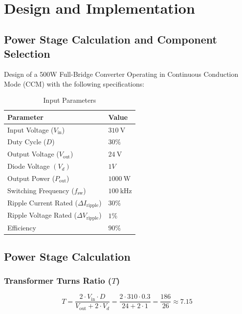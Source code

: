 \section{Design and Implementation}
\subsection{Power Stage Calculation and Component Selection}
Design of a 500W Full-Bridge Converter Operating in Continuous Conduction Mode (CCM) with
the following specifications:
\begin{table}[h!]
    \centering
    \begin{tabular}{ll}
        \toprule
        \textbf{Parameter} & \textbf{Value} \\
        \midrule
        Input Voltage ($V_{\text{in}}$) & $\SI{310}{\volt}$ \\
        Duty Cycle ($D$) & $30\% $ \\
        Output Voltage ($V_{\text{out}}$) & $\SI{24}{\volt}$ \\
        Diode Voltage $(V_d)$ & $1V$\\
        Output Power ($P_{\text{out}}$) & $\SI{1000}{\watt}$ \\
        Switching Frequency ($f_{\text{sw}}$) & $\SI{100}{\kilo\hertz}$ \\
        Ripple Current Rated ($\Delta I_{\text{ripple}}$) & $30\%$ \\
        Ripple Voltage Rated ($\Delta V_{\text{ripple}}$) & $1\%$ \\
        Efficiency & $90\%$ \\
        \bottomrule
    \end{tabular}
    \caption{Input Parameters}
    \label{tab:system_parameters}
\end{table}
\subsection{Power Stage Calculation}

\subsubsection*{Transformer Turns Ratio (\(T\))}
\begin{equation}
T = \frac{2 \cdot V_{\text{in}} \cdot D}{V_{\text{out}} + 2 \cdot V_d} = \frac{2 \cdot 310 \cdot 0.3}{24 + 2 \cdot 1} = \frac{186}{26} \approx \boxed{7.15}
\end{equation}



